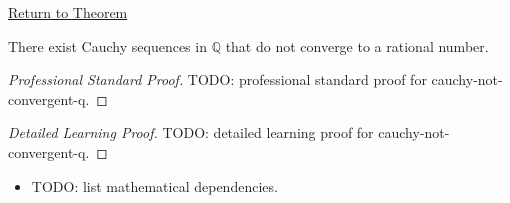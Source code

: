 \newpage
{}
\label{prf:cauchy-not-convergent-q}

\begin{remark*}[Return]
\hyperref[thm:cauchy-not-convergent-q]{Return to Theorem}
\end{remark*}

\begin{theorem*}
There exist Cauchy sequences in $\mathbb{Q}$ that do not converge to a
rational number.
\end{theorem*}

\begin{proof}[Professional Standard Proof]
\LRAProofBodyStart
TODO: professional standard proof for cauchy-not-convergent-q.
\end{proof}

\begin{proof}[Detailed Learning Proof]
\LRAProofBodyStart
TODO: detailed learning proof for cauchy-not-convergent-q.
\end{proof}

\begin{remark*}
\end{remark*}

\begin{dependencies}
\begin{itemize}
  \item TODO: list mathematical dependencies.
\end{itemize}
\end{dependencies}

\clearpage
